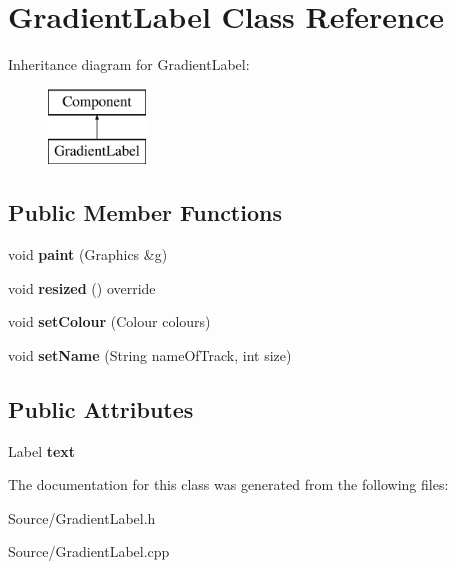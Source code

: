 \hypertarget{class_gradient_label}{}\section{Gradient\+Label Class Reference}
\label{class_gradient_label}
Inheritance diagram for Gradient\+Label\+:\begin{figure}[H]
\begin{center}
\leavevmode
\includegraphics[height=2.000000cm]{class_gradient_label}
\end{center}
\end{figure}
\subsection*{Public Member Functions}
\begin{DoxyCompactItemize}
\item 
\mbox{\label{class_gradient_label_aa22e55d08d7178494b7cb789cf68a241}} 
void {\bfseries paint} (Graphics \&g)
\item 
\mbox{\label{class_gradient_label_a1c1e92717af361517785a1145a1a9860}} 
void {\bfseries resized} () override
\item 
\mbox{\label{class_gradient_label_aacbe75e39fdf28a9415a9322a83cec0d}} 
void {\bfseries set\+Colour} (Colour colours)
\item 
\mbox{\label{class_gradient_label_a8c8db1cbf42da619daabe5718920b1a7}} 
void {\bfseries set\+Name} (String name\+Of\+Track, int size)
\end{DoxyCompactItemize}
\subsection*{Public Attributes}
\begin{DoxyCompactItemize}
\item 
\mbox{\label{class_gradient_label_a47afcde63efbde000077e4455544f2df}} 
Label {\bfseries text}
\end{DoxyCompactItemize}


The documentation for this class was generated from the following files\+:\begin{DoxyCompactItemize}
\item 
Source/Gradient\+Label.\+h\item 
Source/Gradient\+Label.\+cpp\end{DoxyCompactItemize}
